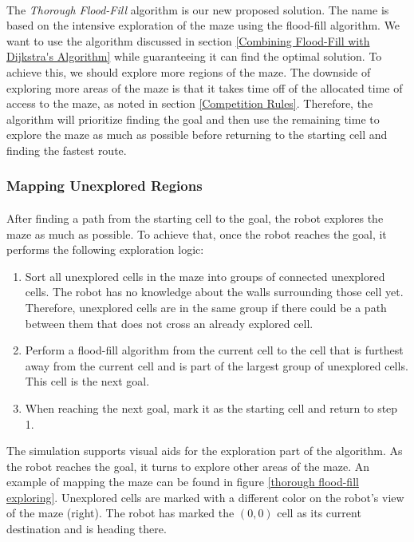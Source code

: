 \documentclass[12pt]{article}
\begin{document}
\paragraph{}
The \textit{Thorough Flood-Fill} algorithm is our new proposed solution.
The name is based on the intensive exploration of the \gls{maze} using the flood-fill algorithm.
We want to use the algorithm discussed in section \ref{Combining Flood-Fill with Dijkstra's Algorithm} while guaranteeing it can find the optimal solution.
To achieve this, we should explore more regions of the \gls{maze}.
The downside of exploring more areas of the \gls{maze} is that it takes time off of the allocated time of access to the \gls{maze}, as noted in section \ref{Competition Rules}.
Therefore, the algorithm will prioritize finding the goal and then use the remaining time to explore the \gls{maze} as much as possible before returning to the starting \gls{cell} and finding the fastest route.

\subsubsection{Mapping Unexplored Regions}
\paragraph{}
After finding a path from the starting \gls{cell} to the goal, the robot explores the \gls{maze} as much as possible.
To achieve that, once the robot reaches the goal, it performs the following exploration logic:
\begin{enumerate}
    \item Sort all unexplored \gls{cell}s in the \gls{maze} into groups of connected unexplored \gls{cell}s.
    The robot has no knowledge about the walls surrounding those \gls{cell} yet. Therefore, unexplored \gls{cell}s are in the same group if there could be a path between them that does not cross an already explored \gls{cell}.
    \item Perform a flood-fill algorithm from the current \gls{cell} to the \gls{cell} that is furthest away from the current \gls{cell} and is part of the largest group of unexplored \gls{cell}s.
    This \gls{cell} is the next goal.
    \item When reaching the next goal, mark it as the starting \gls{cell} and return to step 1.
\end{enumerate}

The simulation supports visual aids for the exploration part of the algorithm.
As the robot reaches the goal, it turns to explore other areas of the \gls{maze}.
An example of mapping the \gls{maze} can be found in figure \ref{thorough flood-fill exploring}.
Unexplored \gls{cell}s are marked with a different color on the robot's view of the \gls{maze} (right).
The robot has marked the $(0,0)$ \gls{cell} as its current destination and is heading there.
\end{document}

